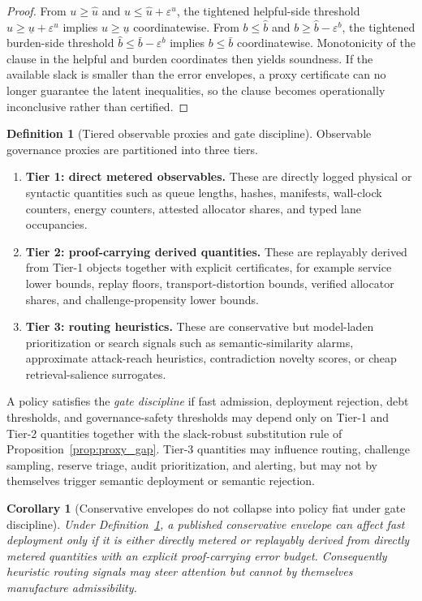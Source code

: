 \documentclass[11pt]{article}
\newtheorem{corollary}[theorem]{Corollary}
\theoremstyle{definition}
\newtheorem{definition}[theorem]{Definition}
\newcommand{\1}{\mathbf{1}}
\newcommand{\eps}{\varepsilon}
\begin{document}
\begin{proof}
From $u\ge \hat u$ and $u\le \hat u+\eps^u$, the tightened helpful-side threshold $\hat u\ge \underline u+\eps^u$ implies $u\ge \underline u$ coordinatewise. From $b\le \hat b$ and $b\ge \hat b-\eps^b$, the tightened burden-side threshold $\hat b\le \bar b-\eps^b$ implies $b\le \bar b$ coordinatewise. Monotonicity of the clause in the helpful and burden coordinates then yields soundness. If the available slack is smaller than the error envelopes, a proxy certificate can no longer guarantee the latent inequalities, so the clause becomes operationally inconclusive rather than certified.
\end{proof}


\begin{definition}[Tiered observable proxies and gate discipline]\label{def:proxy_tiers}
Observable governance proxies are partitioned into three tiers.
\begin{enumerate}[label=(T\arabic*), leftmargin=2em]
  \item \textbf{Tier 1: direct metered observables.} These are directly logged physical or syntactic quantities such as queue lengths, hashes, manifests, wall-clock counters, energy counters, attested allocator shares, and typed lane occupancies.
  \item \textbf{Tier 2: proof-carrying derived quantities.} These are replayably derived from Tier-1 objects together with explicit certificates, for example service lower bounds, replay floors, transport-distortion bounds, verified allocator shares, and challenge-propensity lower bounds.
  \item \textbf{Tier 3: routing heuristics.} These are conservative but model-laden prioritization or search signals such as semantic-similarity alarms, approximate attack-reach heuristics, contradiction novelty scores, or cheap retrieval-salience surrogates.
\end{enumerate}
A policy satisfies the \emph{gate discipline} if fast admission, deployment rejection, debt thresholds, and governance-safety thresholds may depend only on Tier-1 and Tier-2 quantities together with the slack-robust substitution rule of Proposition~\ref{prop:proxy_gap}. Tier-3 quantities may influence routing, challenge sampling, reserve triage, audit prioritization, and alerting, but may not by themselves trigger semantic deployment or semantic rejection.
\end{definition}

\begin{corollary}[Conservative envelopes do not collapse into policy fiat under gate discipline]\label{cor:proxy_tiers}
Under Definition~\ref{def:proxy_tiers}, a published conservative envelope can affect fast deployment only if it is either directly metered or replayably derived from directly metered quantities with an explicit proof-carrying error budget. Consequently heuristic routing signals may steer attention but cannot by themselves manufacture admissibility.
\end{corollary}
\end{document}
